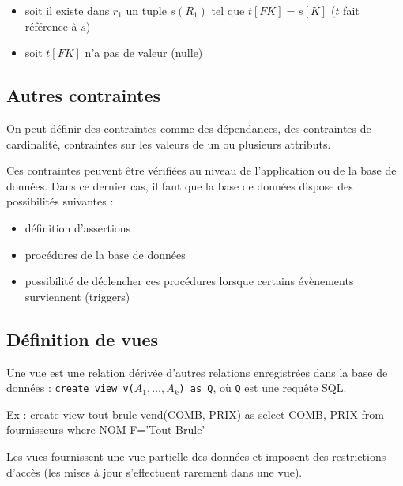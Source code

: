 		\begin{itemize}
			\item soit il existe dans $r_1$ un tuple $s(R_1)$ tel que $t[FK] = s[K]$ ($t$ fait référence à $s$)
			\item soit $t[FK]$ n'a pas de valeur (nulle)
		\end{itemize}
		
		\subsection{Autres contraintes}
		
		On peut définir des contraintes comme des dépendances, des contraintes de cardinalité, contraintes sur les valeurs de un ou plusieurs attributs.
		
		Ces contraintes peuvent être vérifiées au niveau de l'application ou de la base de données. Dans ce dernier cas, il faut que la base de données dispose des possibilités suivantes :
		
		\begin{itemize}
			\item définition d'assertions
			\item procédures de la base de données
			\item possibilité de déclencher ces procédures lorsque certains évènements surviennent (triggers)
		\end{itemize}
		
		
		\subsection{Définition de vues}
		
		Une vue est une relation dérivée d'autres relations enregistrées dans la base de données : \texttt{create view v($A_1, \dots , A_k$) as Q}, où \texttt{Q} est une requête SQL.
		
		Ex : create view tout-brule-vend(COMB, PRIX) as
select COMB, PRIX
from fournisseurs
where NOM F='Tout-Brule'

		Les vues fournissent une vue partielle des données et imposent des restrictions d'accès (les mises à jour s'effectuent rarement dans une vue).